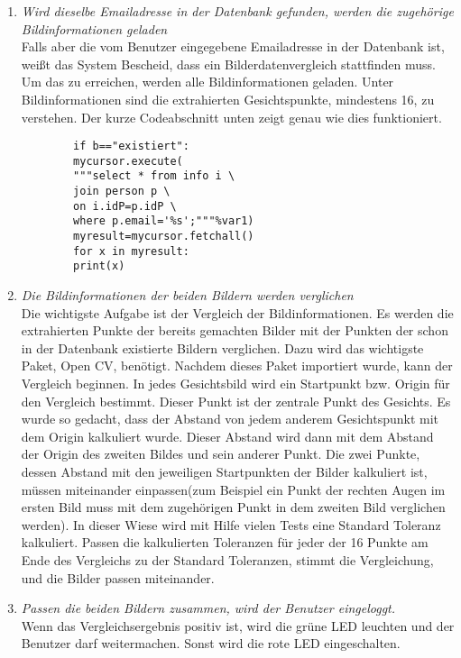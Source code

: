 \begin{enumerate}
		\item \textit{Wird dieselbe Emailadresse in der Datenbank gefunden, werden die zugehörige Bildinformationen geladen} \\
		Falls aber die vom Benutzer eingegebene Emailadresse in der Datenbank ist, weißt das System Bescheid, dass ein Bilderdatenvergleich stattfinden muss. Um das zu erreichen, werden alle Bildinformationen geladen. Unter Bildinformationen sind die extrahierten Gesichtspunkte, mindestens 16, zu verstehen. Der kurze Codeabschnitt unten zeigt genau wie dies funktioniert.
		\begin{lstlisting}
		if b=="existiert":
		mycursor.execute(
		"""select * from info i \
		join person p \
		on i.idP=p.idP \
		where p.email='%s';"""%var1)
		myresult=mycursor.fetchall()
		for x in myresult:
		print(x)
		\end{lstlisting}
		\item \textit{Die Bildinformationen der beiden Bildern werden verglichen} \\
		Die wichtigste Aufgabe ist der Vergleich der Bildinformationen. Es werden die extrahierten Punkte der bereits gemachten Bilder mit der Punkten der schon in der Datenbank existierte Bildern verglichen. Dazu wird das wichtigste Paket, Open CV, ben{\"o}tigt. Nachdem dieses Paket importiert wurde, kann der Vergleich beginnen. In jedes Gesichtsbild wird ein Startpunkt bzw. Origin für den Vergleich bestimmt. Dieser Punkt ist der zentrale Punkt des Gesichts. Es wurde so gedacht, dass der Abstand von jedem anderem Gesichtspunkt mit dem Origin kalkuliert wurde. Dieser Abstand wird dann mit dem Abstand der Origin des zweiten Bildes und sein anderer Punkt. Die zwei Punkte, dessen Abstand mit den jeweiligen Startpunkten der Bilder kalkuliert ist, müssen miteinander einpassen(zum Beispiel ein Punkt der rechten Augen im ersten Bild muss mit dem zugehörigen Punkt in dem zweiten Bild verglichen werden). In dieser Wiese wird mit Hilfe vielen Tests eine Standard Toleranz kalkuliert. Passen die kalkulierten Toleranzen für jeder der 16 Punkte am Ende des Vergleichs zu der Standard Toleranzen, stimmt die Vergleichung, und die Bilder passen miteinander.
		\item \textit{Passen die beiden Bildern zusammen, wird der Benutzer eingeloggt.} \\
		Wenn das Vergleichsergebnis positiv ist, wird die gr{\"u}ne LED leuchten und der Benutzer darf weitermachen. Sonst wird die rote LED eingeschalten.\\
	\end{enumerate}
